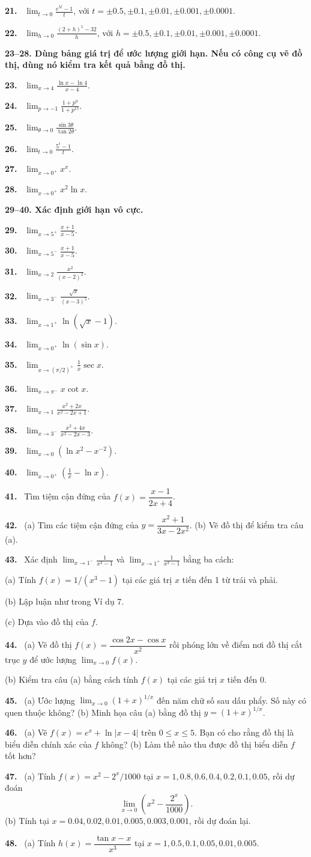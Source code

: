 \documentclass[12pt,a4paper]{article}
\newcommand{\bt}[1]{\par\smallskip\noindent\textbf{#1.}\ }
\newcommand{\group}[1]{\par\medskip\noindent\textbf{#1}\par}
\begin{document}
\bt{21} $\displaystyle\lim_{t\to0}\frac{e^{5t}-1}{t}$, với $t=\pm0.5,\pm0.1,\pm0.01,\pm0.001,\pm0.0001$.
\bt{22} $\displaystyle\lim_{h\to0}\frac{(2+h)^5-32}{h}$, với $h=\pm0.5,\pm0.1,\pm0.01,\pm0.001,\pm0.0001$.
\group{23–28. Dùng bảng giá trị để ước lượng giới hạn. Nếu có công cụ vẽ đồ thị, dùng nó kiểm tra kết quả bằng đồ thị.}
\bt{23} $\displaystyle\lim_{x\to4}\frac{\ln x-\ln4}{x-4}$.
\bt{24} $\displaystyle\lim_{p\to-1}\frac{1+p^9}{1+p^{15}}$.
\bt{25} $\displaystyle\lim_{\theta\to0}\frac{\sin3\theta}{\tan2\theta}$.
\bt{26} $\displaystyle\lim_{t\to0}\frac{5^t-1}{t}$.
\bt{27} $\displaystyle\lim_{x\to0^+}x^x$.
\bt{28} $\displaystyle\lim_{x\to0^+}x^2\ln x$.
\group{29–40. Xác định giới hạn vô cực.}
\bt{29} $\displaystyle\lim_{x\to5^+}\frac{x+1}{x-5}$.
\bt{30} $\displaystyle\lim_{x\to5^-}\frac{x+1}{x-5}$.
\bt{31} $\displaystyle\lim_{x\to2}\frac{x^2}{(x-2)^2}$.
\bt{32} $\displaystyle\lim_{x\to3^-}\frac{\sqrt{x}}{(x-3)^5}$.
\bt{33} $\displaystyle\lim_{x\to1^+}\ln(\sqrt{x}-1)$.
\bt{34} $\displaystyle\lim_{x\to0^+}\ln(\sin x)$.
\bt{35} $\displaystyle\lim_{x\to(\pi/2)^+}\frac1x\sec x$.
\bt{36} $\displaystyle\lim_{x\to\pi^-}x\cot x$.
\bt{37} $\displaystyle\lim_{x\to1}\frac{x^2+2x}{x^2-2x+1}$.
\bt{38} $\displaystyle\lim_{x\to3^-}\frac{x^2+4x}{x^2-2x-3}$.
\bt{39} $\displaystyle\lim_{x\to0}(\ln x^2-x^{-2})$.
\bt{40} $\displaystyle\lim_{x\to0^+}\left(\frac1x-\ln x\right)$.
\bt{41} Tìm tiệm cận đứng của $f(x)=\dfrac{x-1}{2x+4}$.
\bt{42} (a) Tìm các tiệm cận đứng của $y=\dfrac{x^2+1}{3x-2x^2}$. (b) Vẽ đồ thị để kiểm tra câu (a).
\bt{43} Xác định $\displaystyle\lim_{x\to1^-}\frac1{x^3-1}$ và $\displaystyle\lim_{x\to1^+}\frac1{x^3-1}$ bằng ba cách:

(a) Tính $f(x)=1/(x^3-1)$ tại các giá trị $x$ tiến đến 1 từ trái và phải.

(b) Lập luận như trong Ví dụ 7.

(c) Dựa vào đồ thị của $f$.
\bt{44} (a) Vẽ đồ thị $f(x)=\dfrac{\cos2x-\cos x}{x^2}$ rồi phóng lớn về điểm nơi đồ thị cắt trục $y$ để ước lượng $\lim_{x\to0}f(x)$.

(b) Kiểm tra câu (a) bằng cách tính $f(x)$ tại các giá trị $x$ tiến đến 0.
\bt{45} (a) Ước lượng $\lim_{x\to0}(1+x)^{1/x}$ đến năm chữ số sau dấu phẩy. Số này có quen thuộc không? (b) Minh họa câu (a) bằng đồ thị $y=(1+x)^{1/x}$.
\bt{46} (a) Vẽ $f(x)=e^x+\ln|x-4|$ trên $0\le x\le5$. Bạn có cho rằng đồ thị là biểu diễn chính xác của $f$ không? (b) Làm thế nào thu được đồ thị biểu diễn $f$ tốt hơn?
\bt{47} (a) Tính $f(x)=x^2-2^x/1000$ tại $x=1,0.8,0.6,0.4,0.2,0.1,0.05$, rồi dự đoán
\[\lim_{x\to0}\left(x^2-\frac{2^x}{1000}\right).\]
(b) Tính tại $x=0.04,0.02,0.01,0.005,0.003,0.001$, rồi dự đoán lại.
\bt{48} (a) Tính $h(x)=\dfrac{\tan x-x}{x^3}$ tại $x=1,0.5,0.1,0.05,0.01,0.005$.
\end{document}
